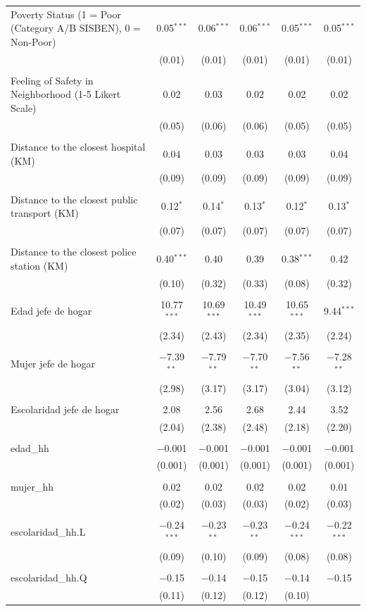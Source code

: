 \begin{table}[H]
\begin{tabularx}{0.9\textwidth}{@{\extracolsep{-7pt}}lccccc}
 Poverty Status (1 = Poor (Category A/B SISBEN), 0 = Non-Poor) & 0.05$^{***}$ & 0.06$^{***}$ & 0.06$^{***}$ & 0.05$^{***}$ & 0.05$^{***}$ \\    & (0.01) & (0.01) & (0.01) & (0.01) & (0.01) \\    & & & & & \\   Feeling of Safety in Neighborhood (1-5 Likert Scale) & 0.02 & 0.03 & 0.02 & 0.02 & 0.02 \\    & (0.05) & (0.06) & (0.06) & (0.05) & (0.05) \\    & & & & & \\   Distance to the closest hospital (KM) & 0.04 & 0.03 & 0.03 & 0.03 & 0.04 \\    & (0.09) & (0.09) & (0.09) & (0.09) & (0.09) \\    & & & & & \\   Distance to the closest public transport  (KM) & 0.12$^{*}$ & 0.14$^{*}$ & 0.13$^{*}$ & 0.12$^{*}$ & 0.13$^{*}$ \\    & (0.07) & (0.07) & (0.07) & (0.07) & (0.07) \\    & & & & & \\   Distance to the closest police station (KM) & 0.40$^{***}$ & 0.40 & 0.39 & 0.38$^{***}$ & 0.42 \\    & (0.10) & (0.32) & (0.33) & (0.08) & (0.32) \\    & & & & & \\   Edad jefe de hogar & 10.77$^{***}$ & 10.69$^{***}$ & 10.49$^{***}$ & 10.65$^{***}$ & 9.44$^{***}$ \\    & (2.34) & (2.43) & (2.34) & (2.35) & (2.24) \\    & & & & & \\   Mujer jefe de hogar & $-$7.39$^{**}$ & $-$7.79$^{**}$ & $-$7.70$^{**}$ & $-$7.56$^{**}$ & $-$7.28$^{**}$ \\    & (2.98) & (3.17) & (3.17) & (3.04) & (3.12) \\    & & & & & \\   Escolaridad jefe de hogar & 2.08 & 2.56 & 2.68 & 2.44 & 3.52 \\    & (2.04) & (2.38) & (2.48) & (2.18) & (2.20) \\    & & & & & \\   edad\_hh & $-$0.001 & $-$0.001 & $-$0.001 & $-$0.001 & $-$0.001 \\    & (0.001) & (0.001) & (0.001) & (0.001) & (0.001) \\    & & & & & \\   mujer\_hh & 0.02 & 0.02 & 0.02 & 0.02 & 0.01 \\    & (0.02) & (0.03) & (0.03) & (0.02) & (0.03) \\    & & & & & \\   escolaridad\_hh.L & $-$0.24$^{***}$ & $-$0.23$^{**}$ & $-$0.23$^{**}$ & $-$0.24$^{***}$ & $-$0.22$^{***}$ \\    & (0.09) & (0.10) & (0.09) & (0.08) & (0.08) \\    & & & & & \\   escolaridad\_hh.Q & $-$0.15 & $-$0.14 & $-$0.15 & $-$0.14 & $-$0.15 \\    & (0.11) & (0.12) & (0.12) & (0.10) 
\end{tabularx}
\end{table}
